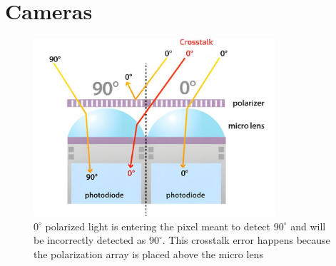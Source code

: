 \chapter{Cameras}
\label{chap:cameras}


\begin{figure}
    \centering
    \includegraphics[width=0.8\textwidth]{figures/crosstalk_upscaled.jpg}
    \caption{$0^{\circ}$ polarized light is entering the pixel meant to detect $90^{\circ}$ and will be incorrectly detected as $90^{\circ}$.  This crosstalk error happens because the polarization array is placed above the micro lens \cite{lucidvisionlabsPolarizationExplainedSony2018}}
    \label{fig:camera_crosstalk}
\end{figure}


